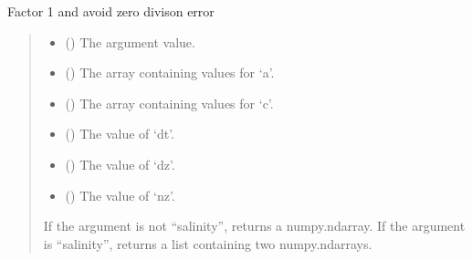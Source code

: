 \documentclass[a4paper,11pt,english,openany]{sphinxmanual}
\begin{document}
\begin{fulllineitems}
\begin{fulllineitems}
\label{\detokenize{api/spyice.models.advection_diffusion:src.spyice.models.advection_diffusion.AdvectionDiffusion.factor_1}}
\pysigstartsignatures
\pysiglinewithargsret
{}
{\sphinxparamcomma {}\sphinxparamcomma {}\sphinxparamcomma {}\sphinxparamcomma {}\sphinxparamcomma {}}
{}
\pysigstopsignatures
\sphinxAtStartPar
Factor 1 and avoid zero divison error
\begin{quote}\begin{description}
\begin{itemize}
\item {} 
\sphinxAtStartPar
{} () \textendash{} The argument value.

\item {} 
\sphinxAtStartPar
{} () \textendash{} The array containing values for ‘a’.

\item {} 
\sphinxAtStartPar
{} () \textendash{} The array containing values for ‘c’.

\item {} 
\sphinxAtStartPar
{} () \textendash{} The value of ‘dt’.

\item {} 
\sphinxAtStartPar
{} () \textendash{} The value of ‘dz’.

\item {} 
\sphinxAtStartPar
{} () \textendash{} The value of ‘nz’.

\end{itemize}

\sphinxAtStartPar
\begin{description}
\sphinxAtStartPar
If the argument is not “salinity”, returns a numpy.ndarray.
If the argument is “salinity”, returns a list containing two numpy.ndarrays.


\end{description}
\end{description}
\end{quote}
\end{fulllineitems}
\end{fulllineitems}
\end{document}
